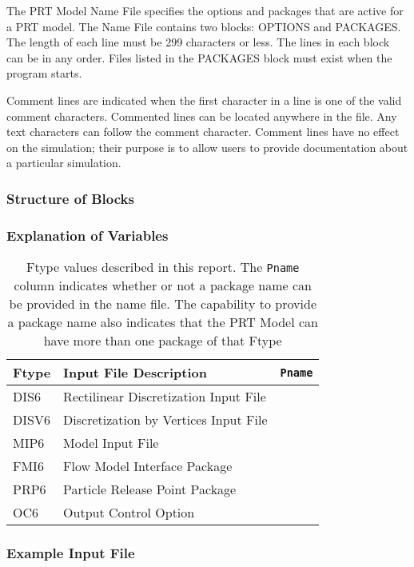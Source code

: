 The PRT Model Name File specifies the options and packages that are active for a PRT model.  The Name File contains two blocks: OPTIONS  and PACKAGES. The length of each line must be 299 characters or less. The lines in each block can be in any order.  Files listed in the PACKAGES block must exist when the program starts. 

Comment lines are indicated when the first character in a line is one of the valid comment characters.  Commented lines can be located anywhere in the file. Any text characters can follow the comment character. Comment lines have no effect on the simulation; their purpose is to allow users to provide documentation about a particular simulation. 

\vspace{5mm}
\subsubsection{Structure of Blocks}



\vspace{5mm}
\subsubsection{Explanation of Variables}
\begin{description}

\end{description}

\begin{table}[H]
\caption{Ftype values described in this report.  The \texttt{Pname} column indicates whether or not a package name can be provided in the name file.  The capability to provide a package name also indicates that the PRT Model can have more than one package of that Ftype}
\small
\begin{center}
\begin{tabular*}{\columnwidth}{l l l}
\hline
\hline
Ftype & Input File Description & \texttt{Pname}\\
\hline
DIS6 & Rectilinear Discretization Input File \\
DISV6 & Discretization by Vertices Input File \\
MIP6 & Model Input File \\
FMI6 & Flow Model Interface Package &  \\ 
PRP6 & Particle Release Point Package \\
OC6 & Output Control Option \\
\hline 
\end{tabular*}
\label{table:ftype-prt}
\end{center}
\normalsize
\end{table}

\vspace{5mm}
\subsubsection{Example Input File}


